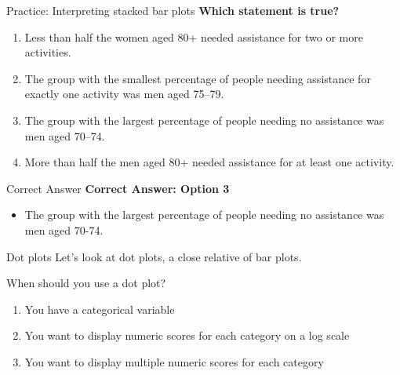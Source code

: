 \documentclass[
  ignorenonframetext,
]{beamer}
\providecommand{\tightlist}{%
  \setlength{\itemsep}{0pt}\setlength{\parskip}{0pt}}
\begin{document}
\begin{frame}{Practice: Interpreting stacked bar plots}
\label{practice-interpreting-stacked-bar-plots-2}
\textbf{Which statement is true?}

\begin{enumerate}
\tightlist
\item
  Less than half the women aged 80+ needed assistance for two or more
  activities.
\item
  The group with the smallest percentage of people needing assistance
  for exactly one activity was men aged 75--79.
\item
  The group with the largest percentage of people needing no assistance
  was men aged 70--74.
\item
  More than half the men aged 80+ needed assistance for at least one
  activity.
\end{enumerate}
\end{frame}

\begin{frame}{Correct Answer}
\label{correct-answer}
\textbf{Correct Answer: Option 3}

\begin{itemize}
\tightlist
\item
  The group with the largest percentage of people needing no assistance
  was men aged 70-74.
\end{itemize}
\end{frame}

\begin{frame}{Dot plots}
\label{dot-plots}
Let's look at dot plots, a close relative of bar plots.
\end{frame}

\begin{frame}{When should you use a dot plot?}
\label{when-should-you-use-a-dot-plot}
\begin{enumerate}
\item
  You have a categorical variable
\item
  You want to display numeric scores for each category on a log scale
\item
  You want to display multiple numeric scores for each category
\end{enumerate}
\end{frame}
\end{document}
